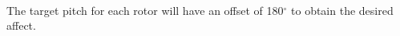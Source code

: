                 \\The target pitch for each rotor will have an offset of 180\(^\circ\) to obtain the desired affect.

